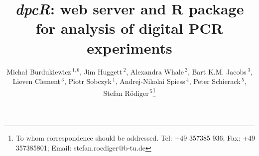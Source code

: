 \documentclass[a4,center,fleqn]{NAR}
\begin{document}
\title{\textit{dpcR}: web server and R package for analysis of digital PCR 
experiments}

\author{%
Micha\l{} Burdukiewicz\,$^{1,6}$,
Jim Huggett\,$^{2}$,
Alexandra Whale\,$^{2}$,
Bart K.M. Jacobs\,$^{3}$,
Lieven Clement\,$^{3}$,
Piotr Sobczyk\,$^{1}$,
Andrej-Nikolai Spiess\,$^{4}$,
Peter Schierack\,$^{5}$,
Stefan R\"odiger\,$^{5}$\footnote{To whom correspondence should be addressed.
Tel: +49 357385 936; Fax: +49 357385801; Email: stefan.roediger@b-tu.de}}

\address{%
$^{1}$Department of Genomics, Faculty of Biotechnology, University of 
Wroc\l{}aw, Wroc\l{}aw, Poland
and
$^{2}$Molecular and Cell Biology Team, LGC, Teddington, United Kingdom
and
$^{3}$Department of Applied Mathematics, Computer Science and Statistics, Ghent 
University, Belgium
and
$^{4}$University Medical Center Hamburg-Eppendorf, Hamburg, Germany
and
$^{5}$Faculty of Natural Sciences, Brandenburg University of Technology 
Cottbus--Senftenberg, Gro\ss{}enhainer Str. 57, 01968, Senftenberg, Germany
}


\maketitle
\end{document}
